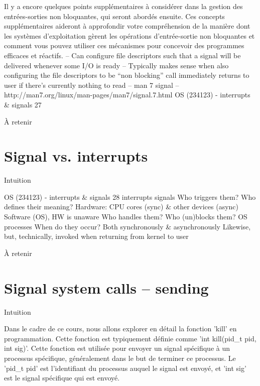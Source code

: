 \documentclass[12pt]{article}
\begin{document}
Il y a encore quelques points supplémentaires à considérer dans la gestion des entrées-sorties non bloquantes, qui seront abordés ensuite. Ces concepts supplémentaires aideront à approfondir votre compréhension de la manière dont les systèmes d'exploitation gèrent les opérations d'entrée-sortie non bloquantes et comment vous pouvez utiliser ces mécanismes pour concevoir des programmes efficaces et réactifs.
– Can configure file descriptors such that a signal will be delivered
whenever some I/O is ready
– Typically makes sense when also configuring the file descriptors to be
“non blocking”
call immediately returns to user if there’s currently nothing to read
– man 7 signal
– http://man7.org/linux/man-pages/man7/signal.7.html
OS (234123) - interrupts \& signals
27
\begin{aretenir}{À retenir}
\end{aretenir}

\section{Signal vs. interrupts}
\begin{myvulga}{Intuition}
\end{myvulga}
OS (234123) - interrupts \& signals
28
interrupts
signals
Who triggers them?
Who defines their meaning?
Hardware:
CPU cores (sync) \&
other devices (async)
Software (OS),
HW is unaware
Who handles them?
Who (un)blocks them?
OS
processes
When do they occur?
Both synchronously
\& asynchronously
Likewise, but,
technically, invoked
when returning
from kernel to user
\begin{aretenir}{À retenir}
\end{aretenir}

\section{Signal system calls – sending}
\begin{myvulga}{Intuition}
\end{myvulga}
Dans le cadre de ce cours, nous allons explorer en détail la fonction 'kill' en programmation. Cette fonction est typiquement définie comme 'int kill(pid_t pid, int sig)'. Cette fonction est utilisée pour envoyer un signal spécifique à un processus spécifique, généralement dans le but de terminer ce processus. Le 'pid_t pid' est l'identifiant du processus auquel le signal est envoyé, et 'int sig' est le signal spécifique qui est envoyé.
\end{document}
